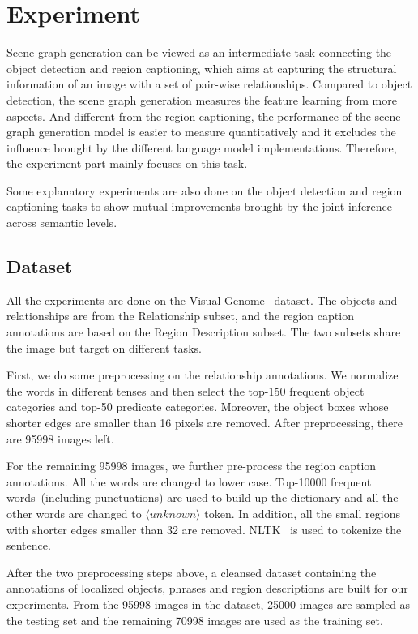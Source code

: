 


\section{Experiment}
Scene graph generation can be viewed as an intermediate task connecting the object detection and region captioning, which aims at capturing the structural information of an image with a set of pair-wise relationships. Compared to object detection, the scene graph generation measures the feature learning from more aspects. And different from the region captioning, the performance of the scene graph generation model is easier to measure quantitatively and it excludes the influence brought by the different language model implementations. Therefore, the experiment part mainly focuses on this task.

Some explanatory experiments are also done on the object detection and region captioning tasks to show mutual improvements brought by the joint inference across semantic levels.

\subsection{Dataset}
\label{sec:dataset}
All the experiments are done on the Visual Genome~\cite{visual_genome} dataset. The objects and relationships are from the Relationship subset, and the region caption annotations are based on the Region Description subset. The two subsets share the image but target on different tasks.

First, we do some preprocessing on the relationship annotations. We normalize the words in different tenses and then select the top-150 frequent object categories and top-50 predicate categories. Moreover, the object boxes whose shorter edges are smaller than 16 pixels are removed. After preprocessing, there are 95998 images left.

For the remaining 95998 images, we further pre-process the region caption annotations. All the words are changed to lower case. Top-10000 frequent words~(including punctuations) are used to build up the dictionary and all the other words are changed to $\langle  unknown\rangle$ token. In addition, all the small regions with shorter edges smaller than 32 are removed. NLTK~\cite{nltk} is used to tokenize the sentence. 

After the two preprocessing steps above, a cleansed dataset containing the annotations of localized objects, phrases and region descriptions are built for our experiments. From the 95998 images in the dataset, 25000 images are sampled as the testing set and the remaining 70998 images are used as the training set. 


